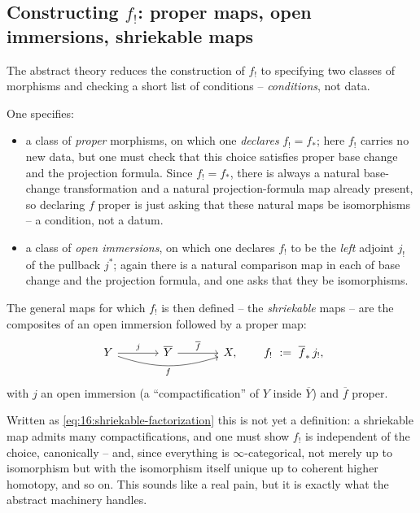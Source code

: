 \subsection{Constructing \texorpdfstring{$f_!$}{f\textunderscore!}: proper maps, open immersions, shriekable maps}
\label{subsec:16:constructing-fshriek}

The abstract theory reduces the construction of $f_!$ to specifying two classes of
morphisms and checking a short list of conditions -- \emph{conditions}, not data.

\begin{remark}
\label{rmk:16:fshriek-idea}
One specifies:
\begin{itemize}
\item a class of \emph{proper} morphisms, on which one \emph{declares} $f_!=f_*$; here
$f_!$ carries no new data, but one must check that this choice satisfies proper base
change and the projection formula. Since $f_!=f_*$, there is always a natural base-change
transformation and a natural projection-formula map already present, so declaring $f$
proper is just asking that these natural maps be isomorphisms -- a condition, not a datum.
\item a class of \emph{open immersions}, on which one declares $f_!$ to be the
\emph{left} adjoint $j_!$ of the pullback $j^*$; again there is a natural comparison
map in each of base change and the projection formula, and one asks that they be
isomorphisms.
\end{itemize}
The general maps for which $f_!$ is then defined -- the \emph{shriekable} maps -- are
the composites of an open immersion followed by a proper map:
\begin{equation}
\label{eq:16:shriekable-factorization}
\begin{tikzcd}[column sep=large]
Y \arrow[r, "j"] \arrow[rr, bend right=18, "f"'] & \overline Y \arrow[r, "\overline f"] & X,
\end{tikzcd}
\qquad f_!\ :=\ \overline f_*\, j_!,
\end{equation}
with $j$ an open immersion (a ``compactification'' of $Y$ inside $\overline Y$) and
$\overline f$ proper.
\end{remark}

\begin{remark}
\label{rmk:16:compactification-caveat}
Written as \eqref{eq:16:shriekable-factorization} this is not yet a definition: a
shriekable map admits many compactifications, and one must show $f_!$ is independent
of the choice, canonically -- and, since everything is $\infty$-categorical, not
merely up to isomorphism but with the isomorphism itself unique up to coherent higher
homotopy, and so on. This sounds like a real pain, but it is exactly what the abstract
machinery handles.
\end{remark}

